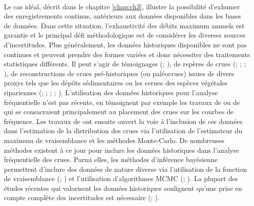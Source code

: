 	\paragraph{} Le cas idéal, décrit dans le chapitre \ref{chap:ch3}, illustre la possibilité d'exhumer des enregistrements continus, antérieurs aux données disponibles dans les bases de données. Dans cette situation, l'exhaustivité des débits maximum annuels est garantie et le principal défi méthodologique est de considérer les diverses sources d'incertitudes. Plus généralement, les données historiques disponibles ne sont pas continues et peuvent prendre des formes variées et donc nécessiter des traitements statistiques différents. Il peut s'agir de témoignages (\cite{pichard_les_1995}; \cite{kjeldsen_documentary_2014}), de repères de crues (\cite{parkes_defining_2016}; \cite{piotte_collection_2016}; \cite{engeland_new_2020}; \cite{medd_reperes_2023}), de reconstructions de crues pré-historiques (ou paléocrues) issues de divers proxys tels que les dépôts sédimentaires ou les cernes des espèces végétales ripariennes (\cite{stedinger_flood_1986}; \cite{benito_use_2004}; \cite{dezileau_multidating_2014}; \cite{st_george_paleofloods_2020}; \cite{engeland_new_2020}). L'utilisation des données historiques pour l'analyse fréquentielle n'est pas récente, en témoignent par exemple les travaux de \citet{benson_use_1950} ou de \citet{hirsch_plotting_1987} qui se consacraient principalement au placement des crues sur les courbes de fréquence. Les travaux de \citet{stedinger_flood_1986} ont ensuite ouvert la voie à l'inclusion de ces données dans l'estimation de la distribution des crues via l'utilisation de l'estimateur du maximum de vraisemblance et les méthodes Monte-Carlo. De nombreuses méthodes existent à ce jour pour inclure les données historiques dans l'analyse fréquentielle des crues. Parmi elles, les méthodes d'inférence bayésienne permettent d'inclure des données de nature diverse via l'utilisation de la fonction de vraisemblance (\cite{stedinger_flood_1986}; \cite{kuczera_comprehensive_1999}) et l'utilisation d'algorithmes MCMC (\cite{reis_bayesian_2005}; \cite{renard_application_2006}). La plupart des études récentes qui valorisent les données historiques soulignent qu'une prise en compte complète des incertitudes est nécessaire (\cite{neppel_flood_2010}; \cite{parkes_defining_2016}).
	
